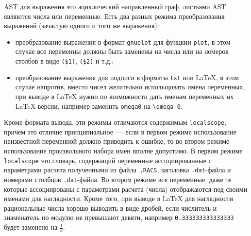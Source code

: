 \documentclass[12pt]{article}
\def\gnuplot{{\tt gnuplot}}
\begin{document}
AST для выражения это ациклический направленный граф, листьями AST являются числа или переменные. 
Есть два разных режима преобразования выражений (зачастую одного и того же выражения):
\begin{itemize}
\item преобразование выражения в формат \gnuplot{} для фунцкии \verb'plot',  в этом случае все переменны должны быть заменены на числа или на номеров столбов
  в виде \verb'($1)', \verb'($2)' и т.д.;
\item преобразование выражения для подписи в форматы \verb'txt' или \LaTeX{}, в этом случае напротив, вместо чисел желательно испольщовать имена переменных,
 при выводе в \LaTeX{} нужно по возможности дать именам переменных их \LaTeX-версии, например заменить \verb'omega0' на \verb'\omega_0'.
\end{itemize}
Кроме формата вывода, эти режимы отличаются содержимым \verb'localscope', причем это отличие принципиальное~--- если в первом режиме
использование неизвестной переменной должно приводить к ошибке, то во втором режиме использование произвольного набора имен вполне допустимо.
В первом режиме \verb'localscope' это словарь, содержащий переменные ассоциированные с параметрами расчета полученными из файла~\verb'.RACS',
заголовка \verb'.dat'-файла и номерами столбцов \verb'.dat'-файла. Во втором режиме все переменные, даже те которые ассоциированы с параметрами расчета (числа)
отображаются под своими именами для наглядности. Кроме того, при выводе в \LaTeX{} для наглядности рациональные числа хорошо выводить в виде дробей,
если числитель и знаменатель по модулю не превышают девяти, например \verb'0.333333333333333' будет заменено на $\frac13$.
\end{document}
